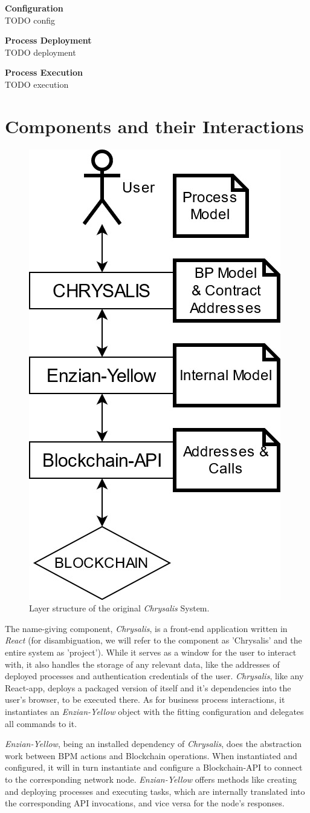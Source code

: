 \textbf{Configuration} \\[0.2em]
TODO config

\textbf{Process Deployment} \\[0.2em]
TODO deployment

\textbf{Process Execution} \\[0.2em]
TODO execution

\section{Components and their Interactions}
\label{sec:init:components}


\begin{figure}[h]
	\centering
	\captionsetup{justification=centering,margin=2cm}
	\includegraphics[height=0.5\textwidth]{gfx/init-components-layers}
	\caption{Layer structure of the original \emph{Chrysalis} System.}
	\label{fig:init:components:layers}
\end{figure}

The name-giving component, \emph{Chrysalis}, is a front-end application written in \emph{React} (for disambiguation, we will refer to the component as 'Chrysalis' and the entire system as 'project'). While it serves as a window for the user to interact with, it also handles the storage of any relevant data, like the addresses of deployed processes and authentication credentials of the user. \emph{Chrysalis}, like any React-app, deploys a packaged version of itself and it's dependencies into the user's browser, to be executed there. As for business process interactions, it instantiates an \emph{Enzian-Yellow} object with the fitting configuration and delegates all commands to it.

\emph{Enzian-Yellow}, being an installed dependency of \emph{Chrysalis}, does the abstraction work between BPM actions and Blockchain operations. When instantiated and configured, it will in turn instantiate and configure a Blockchain-API to connect to the corresponding network node. \emph{Enzian-Yellow} offers methods like creating and deploying processes and executing tasks, which are internally translated into the corresponding API invocations, and vice versa for the node's responses.

